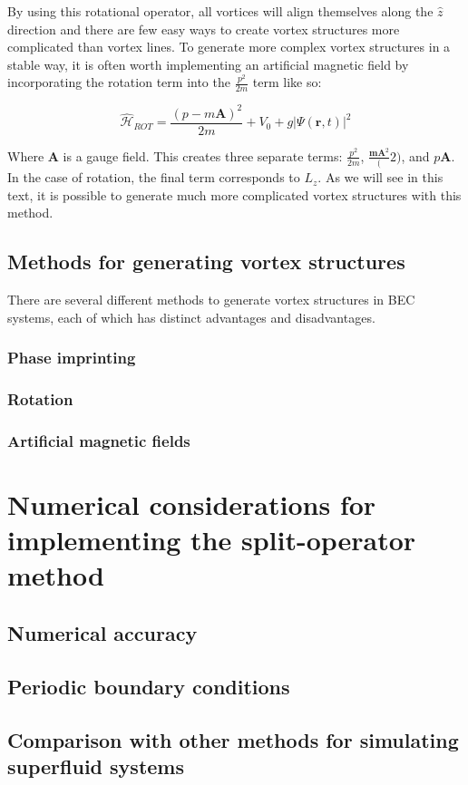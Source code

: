 By using this rotational operator, all vortices will align themselves along the $\hat z$ direction and there are few easy ways to create vortex structures more complicated than vortex lines.
To generate more complex vortex structures in a stable way, it is often worth implementing an artificial magnetic field by incorporating the rotation term into the $\frac{p^2}{2m}$ term like so:

$$
\mathcal{\hat H}_{ROT} = \frac{(p-m\mathbf{A})^2}{2m} + V_0 + g|\Psi(\mathbf{r},t)|^2
$$

Where $\mathbf{A}$ is a gauge field.
This creates three separate terms: $\frac{p^2}{2m}$, $\frac{\mathbf{mA}^2}(2)$, and $p\mathbf{A}$.
In the case of rotation, the final term corresponds to $L_z$.
As we will see in this text, it is possible to generate much more complicated vortex structures with this method.

\subsection{Methods for generating vortex structures}

There are several different methods to generate vortex structures in BEC systems, each of which has distinct advantages and disadvantages.

\subsubsection{Phase imprinting}

\subsubsection{Rotation}

\subsubsection{Artificial magnetic fields}

\section{Numerical considerations for implementing the split-operator method}

\subsection{Numerical accuracy}

\subsection{Periodic boundary conditions}

\subsection{Comparison with other methods for simulating superfluid systems}
